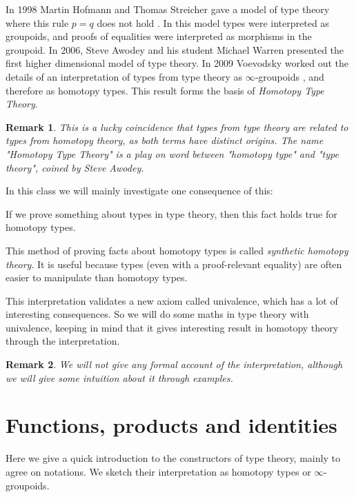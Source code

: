 \documentclass{article}
\newcommand{\se}[1]{\medbreak \medbreak \section{#1}}
\newcommand{\sse}[1]{\medbreak \subsection{#1}}
\newtheorem{remark}{Remark}
\begin{document}
In 1998 Martin Hofmann and Thomas Streicher gave a model of type theory where this rule $p=q$ does not hold \cite{hofmann1998groupoid}. In this model types were interpreted as groupoids, and proofs of equalities were interpreted as morphisms in the groupoid. In 2006, Steve Awodey and his student Michael Warren presented the first higher dimensional model of type theory. In 2009 Voevodsky worked out the details of an interpretation of types from type theory as $\infty$-groupoids \cite{kapulkin2012simplicial}, and therefore as homotopy types. This result forms the basis of \emph{Homotopy Type Theory}. 

\begin{remark}
This is a lucky coincidence that types from type theory are related to types from homotopy theory, as both terms have distinct origins. The name "Homotopy Type Theory" is a play on word between "homotopy type" and "type theory", coined by Steve Awodey.
\end{remark}

In this class we will mainly investigate one consequence of this: 

\begin{center}
If we prove something about types in type theory, then this fact holds true for homotopy types.
\end{center}

This method of proving facts about homotopy types is called \emph{synthetic homotopy theory}. It is useful because types (even with a proof-relevant equality) are often easier to manipulate than homotopy types. 

This interpretation validates a new axiom called univalence, which has a lot of interesting consequences. So we will do some maths in type theory with univalence, keeping in mind that it gives interesting result in homotopy theory through the interpretation. 

\begin{remark}
We will not give any formal account of the interpretation, although we will give some intuition about it through examples.
\end{remark}


\se{Functions, products and identities}

Here we give a quick introduction to the constructors of type theory, mainly to agree on notations. We sketch their interpretation as homotopy types or $\infty$-groupoids.

\end{document}
